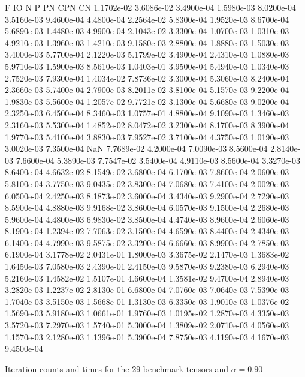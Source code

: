 \documentclass[10pt]{paper}
\begin{document}
\begin{table}
{	F IO N P PN CPN CN
   1.1702e-02   3.6086e-02   3.4900e-04   1.5980e-03   8.0200e-04   3.5160e-03   9.4600e-04
   4.4800e-04   2.2564e-02   5.8300e-04   1.9520e-03   8.6700e-04   5.6890e-03   1.4480e-03
   4.9900e-04   2.1043e-02   3.3300e-04   1.0700e-03   1.0310e-03   4.9210e-03   1.3960e-03
   1.4210e-03   9.1580e-03   2.8800e-04   1.8880e-03   1.5030e-03   3.4000e-03   5.7700e-04
   2.1220e-03   5.1799e-02   3.4900e-04   2.4310e-03   1.0880e-03   5.9710e-03   1.5900e-03
   8.5610e-03   1.0403e-01   3.9500e-04   5.4940e-03   1.0340e-03   2.7520e-03   7.9300e-04
   1.4034e-02   7.8736e-02   3.3000e-04   5.3060e-03   8.2400e-04   2.3660e-03   5.7400e-04
   2.7900e-03   8.2011e-02   3.8100e-04   5.1570e-03   9.2200e-04   1.9830e-03   5.5600e-04
   1.2057e-02   9.7721e-02   3.1300e-04   5.6680e-03   9.0200e-04   2.3250e-03   6.4500e-04
   8.3460e-03   1.0757e-01   4.8800e-04   9.1090e-03   1.3460e-03   2.3160e-03   5.5300e-04
   1.4852e-02   8.0472e-02   3.2300e-04   8.1700e-03   8.3900e-04   1.9770e-03   5.4100e-04
   3.8830e-03   7.9527e-02   3.7100e-04   4.3750e-03   1.0190e-03   3.0020e-03   7.3500e-04
          NaN   7.7689e-02   4.2000e-04   7.0090e-03   8.5600e-04   2.8140e-03   7.6600e-04
   5.3890e-03   7.7547e-02   3.5400e-04   4.9110e-03   8.5600e-04   3.3270e-03   8.6400e-04
   4.6632e-02   8.1549e-02   3.6800e-04   6.1700e-03   7.8600e-04   2.0600e-03   5.8100e-04
   3.7750e-03   9.0435e-02   3.8300e-04   7.0680e-03   7.4100e-04   2.0020e-03   6.0500e-04
   2.4250e-03   8.1873e-02   3.6000e-04   3.4340e-03   9.2900e-04   2.7290e-03   8.5900e-04
   4.8880e-03   9.9168e-02   3.8600e-04   6.0570e-03   9.1500e-04   2.2680e-03   5.9600e-04
   4.4800e-03   6.9830e-02   3.8500e-04   4.4740e-03   8.9600e-04   2.6060e-03   8.1900e-04
   1.2394e-02   7.7063e-02   3.1500e-04   4.6590e-03   8.4400e-04   2.4340e-03   6.1400e-04
   4.7990e-03   9.5875e-02   3.3200e-04   6.6660e-03   8.9900e-04   2.7850e-03   6.1900e-04
   3.1778e-02   2.0431e-01   1.8000e-03   3.3675e-02   2.1470e-03   1.3683e-02   1.6450e-03
   7.0580e-03   2.4390e-01   2.4150e-03   9.5870e-03   9.2380e-03   6.2940e-03   5.2160e-03
   1.4582e-02   1.5107e-01   4.6600e-04   1.3581e-02   9.4700e-04   2.8940e-03   3.2820e-03
   1.2237e-02   2.8130e-01   6.6800e-04   7.0760e-03   7.0640e-03   7.5390e-03   1.7040e-03
   3.5150e-03   1.5668e-01   1.3130e-03   6.3350e-03   1.9010e-03   1.0376e-02   1.5690e-03
   5.9180e-03   1.0661e-01   1.9760e-03   1.0195e-02   1.2870e-03   4.3350e-03   3.5720e-03
   7.2970e-03   1.5740e-01   5.3000e-04   1.3809e-02   2.0710e-03   4.0560e-03   1.1570e-03
   2.1280e-03   1.1396e-01   5.3900e-04   7.8750e-03   4.1190e-03   4.1670e-03   9.4500e-04
   }	
	\caption{Iteration counts and times for the 29 benchmark tensors and $\alpha = 0.90$}
\end{table}
\end{document}
